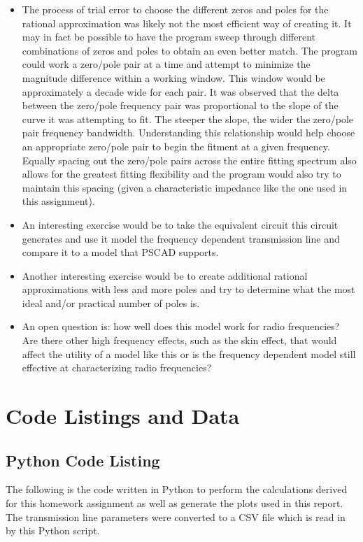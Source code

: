 \documentclass[10pt, oneside, letterpaper]{article}
\begin{document}
\begin{itemize}
    \item The process of trial error to choose the different zeros and poles for the rational approximation was likely not the most efficient way of creating it. It may in fact be possible to have the program sweep through different combinations of zeros and poles to obtain an even better match. The program could work a zero/pole pair at a time and attempt to minimize the magnitude difference within a working window. This window would be approximately a decade wide for each pair. It was observed that the delta between the zero/pole frequency pair was proportional to the slope of the curve it was attempting to fit. The steeper the slope, the wider the zero/pole pair frequency bandwidth. Understanding this relationship would help choose an appropriate zero/pole pair to begin the fitment at a given frequency. Equally spacing out the zero/pole pairs across the entire fitting spectrum also allows for the greatest fitting flexibility and the program would also try to maintain this spacing (given a characteristic impedance like the one used in this assignment).
    \item An interesting exercise would be to take the equivalent circuit this circuit generates and use it model the frequency dependent transmission line and compare it to a model that PSCAD supports.
    \item Another interesting exercise would be to create additional rational approximations with less and more poles and try to determine what the most ideal and/or practical number of poles is.
    \item An open question is: how well does this model work for radio frequencies? Are there other high frequency effects, such as the skin effect, that would affect the utility of a model like this or is the frequency dependent model still effective at characterizing radio frequencies?
\end{itemize}

\newpage
\section{Code Listings and Data}

\subsection{Python Code Listing}
\label{code-listing-python}
The following is the code written in Python to perform the calculations derived for this homework assignment as well as generate the plots used in this report. The transmission line parameters were converted to a CSV file which is read in by this Python script.

\end{document}
